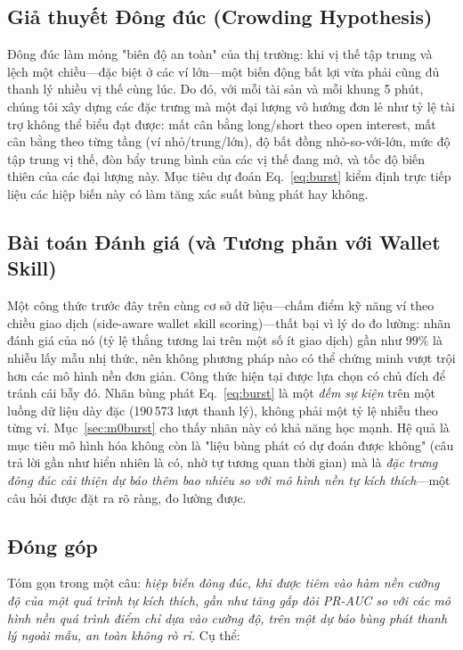 \documentclass[11pt,a4paper]{article}
\begin{document}
\subsection{Giả thuyết Đông đúc (Crowding Hypothesis)}

Đông đúc làm mỏng "biên độ an toàn" của thị trường: khi vị thế tập trung và lệch một chiều---đặc biệt ở các ví lớn---một biến động bất lợi vừa phải cũng đủ thanh lý nhiều vị thế cùng lúc. Do đó, với mỗi tài sản và mỗi khung 5 phút, chúng tôi xây dựng các đặc trưng mà một đại lượng vô hướng đơn lẻ như tỷ lệ tài trợ không thể biểu đạt được: mất cân bằng long/short theo open interest, mất cân bằng theo từng tầng (ví nhỏ/trung/lớn), độ bất đồng nhỏ-so-với-lớn, mức độ tập trung vị thế, đòn bẩy trung bình của các vị thế đang mở, và tốc độ biến thiên của các đại lượng này. Mục tiêu dự đoán Eq.~\eqref{eq:burst} kiểm định trực tiếp liệu các hiệp biến này có làm tăng xác suất bùng phát hay không.

\subsection{Bài toán Đánh giá (và Tương phản với Wallet Skill)}

Một công thức trước đây trên cùng cơ sở dữ liệu---chấm điểm kỹ năng ví theo chiều giao dịch (side-aware wallet skill scoring)---thất bại vì lý do đo lường: nhãn đánh giá của nó (tỷ lệ thắng tương lai trên một số ít giao dịch) gần như $99\%$ là nhiễu lấy mẫu nhị thức, nên không phương pháp nào có thể chứng minh vượt trội hơn các mô hình nền đơn giản. Công thức hiện tại được lựa chọn có chủ đích để tránh cái bẫy đó. Nhãn bùng phát Eq.~\eqref{eq:burst} là một \emph{đếm sự kiện} trên một luồng dữ liệu dày đặc (190\,573 lượt thanh lý), không phải một tỷ lệ nhiễu theo từng ví. Mục~\ref{sec:m0burst} cho thấy nhãn này có khả năng học mạnh. Hệ quả là mục tiêu mô hình hóa không còn là "liệu bùng phát có dự đoán được không" (câu trả lời gần như hiển nhiên là có, nhờ tự tương quan thời gian) mà là \emph{đặc trưng đông đúc cải thiện dự báo thêm bao nhiêu so với mô hình nền tự kích thích}---một câu hỏi được đặt ra rõ ràng, đo lường được.

\subsection{Đóng góp}

Tóm gọn trong một câu: \emph{hiệp biến đông đúc, khi được tiêm vào hàm nền cường độ của một quá trình tự kích thích, gần như tăng gấp đôi PR-AUC so với các mô hình nền quá trình điểm chỉ dựa vào cường độ, trên một dự báo bùng phát thanh lý ngoài mẫu, an toàn không rò rỉ.} Cụ thể:
\end{document}
